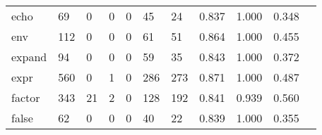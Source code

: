 \begin{longtable}{lp{1.2cm}p{1.2cm}p{1.2cm}p{1.2cm}p{1.2cm}p{1.2cm}p{1.2cm}p{1.2cm}p{1.2cm}p{1.2cm}}
echo      &                                    69 &                                                  0 &                                                  0 &                                                  0 &                                                 45 &                                                 24 &                                         0.837 &                                              1.000 &                                              0.348 \\
env       &                                   112 &                                                  0 &                                                  0 &                                                  0 &                                                 61 &                                                 51 &                                         0.864 &                                              1.000 &                                              0.455 \\
expand    &                                    94 &                                                  0 &                                                  0 &                                                  0 &                                                 59 &                                                 35 &                                         0.843 &                                              1.000 &                                              0.372 \\
expr      &                                   560 &                                                  0 &                                                  1 &                                                  0 &                                                286 &                                                273 &                                         0.871 &                                              1.000 &                                              0.487 \\
factor    &                                   343 &                                                 21 &                                                  2 &                                                  0 &                                                128 &                                                192 &                                         0.841 &                                              0.939 &                                              0.560 \\
false     &                                    62 &                                                  0 &                                                  0 &                                                  0 &                                                 40 &                                                 22 &                                         0.839 &                                              1.000 &                                              0.355 \\

\end{longtable}
